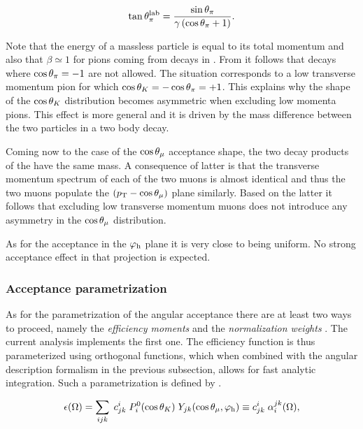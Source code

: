 \begin{equation}
  \centering
  \tan\thetapi^\lab = \frac{\sin\thetapi}{\gamma\parenthesis{\cos\thetapi + 1} }.
  \label{pi_angle_massless}
\end{equation}

\noindent Note that the energy of a massless particle is equal to its total momentum and also that $\beta \simeq 1$
for pions coming from \BJpsiKpi decays in \lhcb. From  it follows that decays where $\cos\theta_{\pi}=-1$
are not allowed. The situation corresponds to a low transverse momentum pion for which $\cos\theta_{K} = -\cos\theta_{\pi} = +1$.
This explains why the shape of the $\cos\theta_{K}$ distribution becomes asymmetric when excluding low momenta pions.
This effect is more general and it is driven by the mass difference between the two particles in a two body decay.

Coming now to the case of the $\cos\theta_{\mu}$ acceptance shape, the two decay products of the \jpsi have
the same mass. A consequence of latter is that the transverse momentum spectrum of each of the two muons
is almost identical and thus the two muons populate the $(\mbox{$p_{\rm T}$}-\cos\theta_{\mu})$ plane similarly.
Based on the latter it follows that excluding low transverse momentum muons does not introduce any asymmetry
in the $\cos\theta_{\mu}$ distribution.

As for the acceptance in the ${\varphi_{\text h}}$ plane it is very close to being uniform.
No strong acceptance effect in that projection is expected.

\subsubsection{Acceptance parametrization}
\label{Acceptance parametrization}
As for the parametrization of the angular acceptance there are at least two ways to proceed,
namely the \emph{efficiency moments} \cite{jeroenThesis} and the \emph{normalization weights} \cite{tristanThesis,jeroenThesis}.
The current analysis implements the first one. The efficiency function is thus parameterized using orthogonal functions,
which when combined with the angular description formalism in the previous subsection, allows for fast analytic
integration. Such a parametrization is defined by .

\begin{equation}
  \centering
  \epsilon(\Omega) = \sum_{ijk} \; \moment{i}{j}{k} \; P_i^0(\cos\thetaK) \; Y_{jk}(\cos\thetamu,\phihel) \equiv \moment{i}{j}{k} \; \effbase,
  \label{eff_func}
\end{equation}

